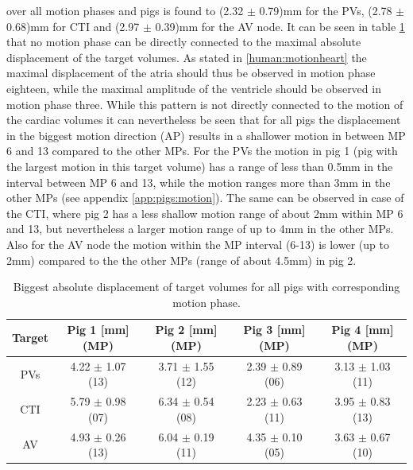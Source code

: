 \documentclass[type=dr, dr=rernat, accentcolor=tud7b,colorbacktitle, bigchapter, openright, twoside, 12pt ]{tudthesis}
\begin{document}
over all motion phases and pigs is found to (2.32 $\pm$ 0.79)mm for the PVs, (2.78 $\pm$ 0.68)mm for CTI and (2.97 $\pm$ 0.39)mm for the AV node.\newline
\newline
It can be seen in table \ref{tab:maxabsmotion_allpigs} that no motion phase can be directly connected to the maximal absolute 
displacement of the target volumes. As stated in \ref{human:motionheart} the maximal displacement of the atria should thus be observed in 
motion phase eighteen, while the maximal amplitude of the ventricle should be observed in motion phase three. 
While this pattern is not directly connected to the motion of the cardiac volumes it can nevertheless be seen that for all pigs the 
displacement in the biggest motion direction (AP) results in a shallower motion in between MP 6 and 13 compared to the other MPs. 
For the PVs the motion in pig 1 (pig with the largest motion in this target volume) has a range of less than 0.5mm in the interval between MP 
6 and 13, while the motion ranges more than 3mm in the other MPs (see appendix \ref{app:pigs:motion}). The same can be observed in case of the 
CTI, where pig 2 has a less shallow motion range of about 2mm within MP 6 and 13, but nevertheless a larger motion range of up to 4mm in the 
other MPs. Also for the AV node the motion within the MP interval (6-13) is lower (up to 2mm) compared to the the other MPs (range of about 
4.5mm) in pig 2. 

\vspace*{0.8cm}

\begin{table}[H]
  \centering
  \caption{Biggest absolute displacement of target volumes for all pigs with corresponding motion phase.}
  \begin{tabular}{|c|c|c|c|c|}
    \hline\hline
    Target & Pig 1 [mm] (MP) & Pig 2 [mm] (MP) & Pig 3 [mm] (MP) & Pig 4 [mm] (MP) \\
    \hline
    PVs & 4.22 $\pm$ 1.07 (13) & 3.71 $\pm$ 1.55 (12) & 2.39 $\pm$ 0.89 (06) & 3.13 $\pm$ 1.03 (11) \\
    CTI & 5.79 $\pm$ 0.98 (07) & 6.34 $\pm$ 0.54 (08) & 2.23 $\pm$ 0.63 (11) & 3.95 $\pm$ 0.83 (13) \\
    AV & 4.93 $\pm$ 0.26 (13) & 6.04 $\pm$ 0.19 (11) & 4.35 $\pm$ 0.10 (05)  & 3.63 $\pm$ 0.67 (10) \\
    \hline\hline
  \end{tabular}
  \label{tab:maxabsmotion_allpigs}
\end{table}
\end{document}
